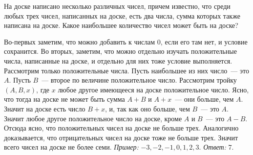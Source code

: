 На доске написано несколько различных чисел, причем известно, что среди любых
трех чисел, написанных на доске, есть два числа, сумма которых также написана
на доске.
Какое наибольшее количество чисел может быть на доске?

\solution
Во-первых заметим, что можно добавить к числам 0, если его там нет,
и условие сохранится.
Во вторых, заметим, что можно отдельно изучать положительные числа,
написанные на доске, и отдельно для них тоже условие выполняется.
Рассмотрим только положительные числа.
Пусть наибольшее из них число~--- это $A$.
Пусть $B$~--- второе по величине положительное число.
Рассмотрим тройку $(A, B, x)$, где $x$ любое другое имеющееся на доске
положительное число.
Ясно, что тогда на доске не может быть сумма $A + B$ и $A + x$~--- они больше,
чем $A$.
Значит на доске есть число $B + x$, и, так как оно больше, чем $B$~--- это $A$.
Значит любое другое положительное число на доске, кроме $A$ и $B$~---
это $A - B$.
Отсюда ясно, что положительных чисел на доске не больше трех.
Аналогично доказывается, что отрицательных чисел на доске тоже не больше трех.
Значит всего чисел на доске не более семи.
\emph{Пример:} $-3, -2, -1, 0, 1, 2, 3$.
\emph{Ответ:} 7.


